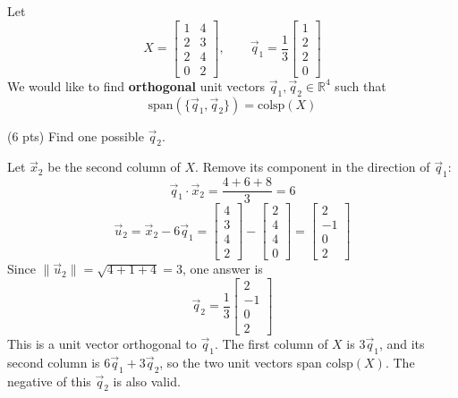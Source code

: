 \documentclass[11pt]{article}
\begin{document}
\begin{prob}[(16 pts)]
Let
\[
X=\begin{bmatrix}1&4\\2&3\\2&4\\0&2\end{bmatrix},\qquad
\vec q_1=\frac13\begin{bmatrix}1\\2\\2\\0\end{bmatrix}
\]
We would like to find \textbf{orthogonal} unit vectors $\vec q_1,\vec q_2\in\mathbb R^4$ such that
{\setlength{\belowdisplayskip}{0pt}\setlength{\belowdisplayshortskip}{0pt}
\[
\text{span}(\{\vec q_1,\vec q_2\})=\text{colsp}(X)
\]}
\vspace{-0.6em}
\begin{subprob}(6 pts)
Find one possible $\vec q_2$.\par\vspace{0.2em}

\begin{solution}
Let $\vec x_2$ be the second column of $X$. Remove its component in the direction of $\vec q_1$:
\[
\vec q_1\cdot\vec x_2=\frac{4+6+8}{3}=6
\]
\[
\vec u_2=\vec x_2-6\vec q_1
=\begin{bmatrix}4\\3\\4\\2\end{bmatrix}
-\begin{bmatrix}2\\4\\4\\0\end{bmatrix}
=\begin{bmatrix}2\\-1\\0\\2\end{bmatrix}
\]
Since $\|\vec u_2\|=\sqrt{4+1+4}=3$, one answer is
\[
\boxed{\vec q_2=\frac13\begin{bmatrix}2\\-1\\0\\2\end{bmatrix}}
\]
This is a unit vector orthogonal to $\vec q_1$. The first column of $X$ is $3\vec q_1$, and its second column is $6\vec q_1+3\vec q_2$, so the two unit vectors span $\text{colsp}(X)$. The negative of this $\vec q_2$ is also valid.
\end{solution}
\end{subprob}
\newpage



\end{prob}
\end{document}
